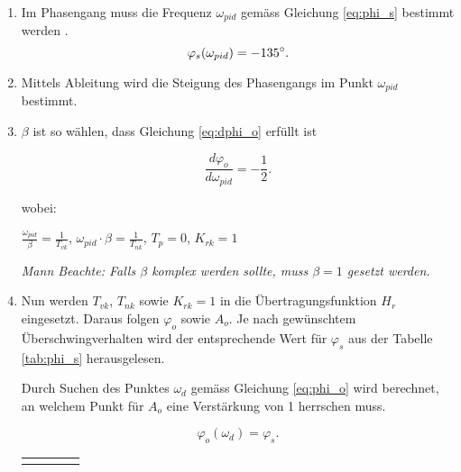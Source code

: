 \begin{enumerate}
    \item
        Im  Phasengang muss  die  Frequenz  $\omega_{pid}$ gem\"ass  Gleichung
        \ref{eq:phi_s} bestimmt werden \footnotemark[1].
        \begin{equation} \label{eq:phi_s}
            \varphi_s(\omega_{pid}) = -135 \degree.
        \end{equation}
    \item
        Mittels  Ableitung  wird  die  Steigung des  Phasengangs  im  Punkt  $
        \omega_{pid} $ bestimmt.
    \item
        $\beta$ ist so w\"ahlen, dass Gleichung \ref{eq:dphi_o} erf\"ullt ist

        \begin{equation} \label{eq:dphi_o}
            \frac{d\varphi_o}{d\omega_{pid}}= -\frac{1}{2}.
        \end{equation}

        wobei:
        \vspace*{1em}

        \begin{center}
            $\frac{\omega_{pid}}{\beta}=\frac{1}{T_{vk}}$,
            $\omega_{pid} \cdot \beta=\frac{1}{T_{nk}}$,
            $T_p = 0$,
            $K_{rk} = 1$
        \end{center}

        \vspace*{1em}
        {\em{Mann Beachte: Falls $\beta$ komplex werden sollte, muss $\beta=1$ gesetzt werden.}}
        \vspace*{1em}
    \item
        Nun   werden    $T_{vk}$,   $T_{nk}$   sowie   $K_{rk}=1$    in   die
        \"Ubertragungsfunktion  $H_r$  eingesetzt. Daraus folgen  $\varphi_o$
        sowie $A_o$.   Je nach  gew\"unschtem \"Uberschwingverhalten  wird der
        entsprechende Wert  f\"ur $\varphi_s$ aus der  Tabelle \ref{tab:phi_s}
        herausgelesen.

        Durch Suchen des Punktes  $\omega_d$ gem\"ass Gleichung \ref{eq:phi_o}
        wird berechnet, an welchem Punkt  f\"ur $A_o$ eine Verst\"arkung von 1
        herrschen muss.

        \begin{equation} \label{eq:phi_o}
            \varphi_o(\omega_d)=\varphi_s.
        \end{equation}

        \begin{longtable}{llll}
            \toprule
            \endhead
            \endfoot
            \endlastfoot


\end{longtable}
\end{enumerate}
